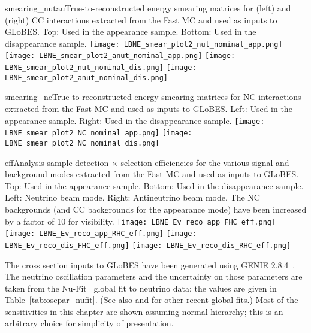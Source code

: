 \begin{cdrfigure}{smearing_nutau}{True-to-reconstructed energy smearing matrices for \nutau (left) and \anutau (right) CC interactions extracted from the Fast MC and used as inputs to GLoBES.  Top: Used in the appearance sample.  Bottom: Used in the disappearance sample.}
 \texttt{[image: LBNE\_smear\_plot2\_nut\_nominal\_app.png]}
 \texttt{[image: LBNE\_smear\_plot2\_anut\_nominal\_app.png]}
 \texttt{[image: LBNE\_smear\_plot2\_nut\_nominal\_dis.png]}
 \texttt{[image: LBNE\_smear\_plot2\_anut\_nominal\_dis.png]}
\end{cdrfigure}

\begin{cdrfigure}{smearing_nc}{True-to-reconstructed energy smearing matrices for NC interactions extracted from the Fast MC and used as inputs to GLoBES.  Left: Used in the appearance sample.  Right: Used in the disappearance sample.}
 \texttt{[image: LBNE\_smear\_plot2\_NC\_nominal\_app.png]}
 \texttt{[image: LBNE\_smear\_plot2\_NC\_nominal\_dis.png]}
\end{cdrfigure}

\begin{cdrfigure}{eff}{Analysis sample detection $\times$ selection efficiencies for the various signal and background modes extracted from the Fast MC and used as inputs to GLoBES.  Top: Used in the appearance sample. Bottom: Used in the disappearance sample.  Left: Neutrino beam mode.  Right: Antineutrino beam mode.  The NC backgrounds (and \numu CC backgrounds for the appearance mode) have been increased by a factor of 10 for visibility.}
 \texttt{[image: LBNE\_Ev\_reco\_app\_FHC\_eff.png]}
 \texttt{[image: LBNE\_Ev\_reco\_app\_RHC\_eff.png]}
 \texttt{[image: LBNE\_Ev\_reco\_dis\_FHC\_eff.png]}
 \texttt{[image: LBNE\_Ev\_reco\_dis\_RHC\_eff.png]}
\end{cdrfigure}

The cross section inputs to GLoBES have been generated using GENIE
2.8.4~\cite{Andreopoulos:2009rq}.  The neutrino oscillation parameters
and the uncertainty on those parameters are taken from the
Nu-Fit~\cite{Gonzalez-Garcia:2014bfa} global fit to neutrino data; the
values are given in Table~\ref{tab:oscpar_nufit}.  (See also
\cite{Capozzi:2013csa} and \cite{Forero:2014bxa} for other recent
global fits.) Most of the sensitivities in this chapter are shown
assuming normal hierarchy; this is an arbitrary choice for simplicity
of presentation.

